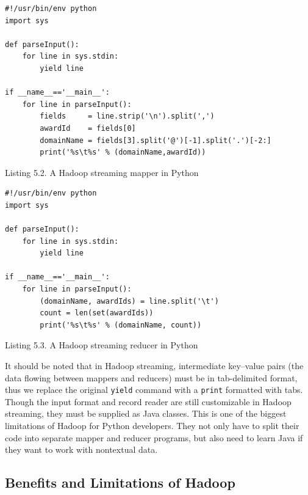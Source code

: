 \documentclass[]{krantz}
\begin{document}
\hypertarget{lst:mapper}{\label{lst:mapper}}
\begin{verbatim}
#!/usr/bin/env python
import sys

def parseInput():
    for line in sys.stdin:
        yield line

if __name__=='__main__':
    for line in parseInput():
        fields     = line.strip('\n').split(',')
        awardId    = fields[0]
        domainName = fields[3].split('@')[-1].split('.')[-2:]
        print('%s\t%s' % (domainName,awardId))
\end{verbatim}

Listing 5.2. A Hadoop streaming mapper in Python

\hypertarget{lst:reducer}{\label{lst:reducer}}
\begin{verbatim}
#!/usr/bin/env python
import sys

def parseInput():
    for line in sys.stdin:
        yield line

if __name__=='__main__':
    for line in parseInput():
        (domainName, awardIds) = line.split('\t')
        count = len(set(awardIds))
        print('%s\t%s' % (domainName, count))
\end{verbatim}

Listing 5.3. A Hadoop streaming reducer in Python

It should be noted that in Hadoop streaming, intermediate key--value
pairs (the data flowing between mappers and reducers) must be in
tab-delimited format, thus we replace the original \texttt{yield}
command with a \texttt{print} formatted with tabs. Though the input
format and record reader are still customizable in Hadoop streaming,
they must be supplied as Java classes. This is one of the biggest
limitations of Hadoop for Python developers. They not only have to split
their code into separate mapper and reducer programs, but also need to
learn Java if they want to work with nontextual data.

\subsection{Benefits and Limitations of
Hadoop}\label{benefits-and-limitations-of-hadoop}
\end{document}
